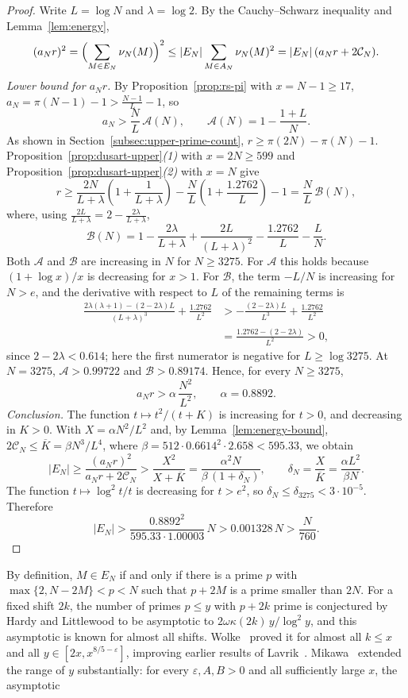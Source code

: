 \documentclass[11pt]{amsart}
\theoremstyle{definition}
\theoremstyle{remark}
\begin{document}
\begin{proof}
Write $L=\log N$ and $\lambda=\log 2$. By the Cauchy--Schwarz inequality and Lemma~\ref{lem:energy},
\[
(a_N r)^2=\Bigl(\sum_{M\in E_N}\nu_N(M)\Bigr)^2\leq |E_N|\sum_{M\in A_N}\nu_N(M)^2=|E_N|\,(a_N r+2\mathcal C_N).
\]
\emph{Lower bound for $a_N r$.} By Proposition~\ref{prop:rs-pi} with $x=N-1\geq 17$, $a_N=\pi(N-1)-1>\frac{N-1}{L}-1$, so
\[
a_N>\frac{N}{L}\,\mathcal A(N),\qquad \mathcal A(N)=1-\frac{1+L}{N}.
\]
As shown in Section~\ref{subsec:upper-prime-count}, $r\geq \pi(2N)-\pi(N)-1$. Proposition~\ref{prop:dusart-upper}\emph{(1)} with $x=2N\geq 599$ and Proposition~\ref{prop:dusart-upper}\emph{(2)} with $x=N$ give
\[
r\geq \frac{2N}{L+\lambda}\left(1+\frac{1}{L+\lambda}\right)-\frac{N}{L}\left(1+\frac{1.2762}{L}\right)-1=\frac{N}{L}\,\mathcal B(N),
\]
where, using $\frac{2L}{L+\lambda}=2-\frac{2\lambda}{L+\lambda}$,
\[
\mathcal B(N)=1-\frac{2\lambda}{L+\lambda}+\frac{2L}{(L+\lambda)^2}-\frac{1.2762}{L}-\frac{L}{N}.
\]
Both $\mathcal A$ and $\mathcal B$ are increasing in $N$ for $N\geq 3275$. For $\mathcal A$ this holds because $(1+\log x)/x$ is decreasing for $x>1$. For $\mathcal B$, the term $-L/N$ is increasing for $N>e$, and the derivative with respect to $L$ of the remaining terms is
\begin{align*}
\frac{2\lambda(\lambda+1)-(2-2\lambda)L}{(L+\lambda)^3}+\frac{1.2762}{L^2}&>-\frac{(2-2\lambda)L}{L^3}+\frac{1.2762}{L^2}\\
&=\frac{1.2762-(2-2\lambda)}{L^2}>0,
\end{align*}
since $2-2\lambda<0.614$; here the first numerator is negative for $L\geq\log 3275$. At $N=3275$, $\mathcal A>0.99722$ and $\mathcal B>0.89174$. Hence, for every $N\geq 3275$,
\[
a_N r>\alpha\,\frac{N^2}{L^2},\qquad \alpha=0.8892.
\]
\emph{Conclusion.} The function $t\mapsto t^2/(t+K)$ is increasing for $t>0$, and decreasing in $K>0$. With $X=\alpha N^2/L^2$ and, by Lemma~\ref{lem:energy-bound}, $2\mathcal C_N\leq \overline K=\beta N^3/L^4$, where $\beta=512\cdot 0.6614^2\cdot 2.658<595.33$, we obtain
\[
|E_N|\geq\frac{(a_N r)^2}{a_N r+2\mathcal C_N}>\frac{X^2}{X+\overline K}=\frac{\alpha^2 N}{\beta\,(1+\delta_N)},\qquad \delta_N=\frac{X}{\overline K}=\frac{\alpha L^2}{\beta N}.
\]
The function $t\mapsto \log^2 t/t$ is decreasing for $t>e^2$, so $\delta_N\leq \delta_{3275}<3\cdot 10^{-5}$. Therefore
\[
|E_N|>\frac{0.8892^2}{595.33\cdot 1.00003}\,N>0.001328\,N>\frac{N}{760}.
\]
\end{proof}
By definition, $M\in E_N$ if and only if there is a prime $p$ with $\max\{2,N-2M\}<p<N$ such that $p+2M$ is a prime smaller than $2N$. For a fixed shift $2k$, the number of primes $p\leq y$ with $p+2k$ prime is conjectured by Hardy and Littlewood to be asymptotic to $2\omega\kappa(2k)\,y/\log^2 y$, and this asymptotic is known for almost all shifts. Wolke~\cite{wolke1989primzahl} proved it for almost all $k\leq x$ and all $y\in[2x,x^{8/5-\varepsilon}]$, improving earlier results of Lavrik~\cite{lavrik1961number}. Mikawa~\cite{mikawa1991prime} extended the range of $y$ substantially: for every $\varepsilon,A,B>0$ and all sufficiently large $x$, the asymptotic
\end{document}
